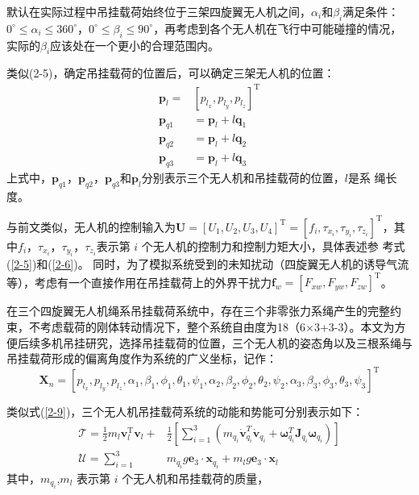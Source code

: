 \documentclass[lang=chs, degree=master, blindreview=false, winfonts=true]{yanputhesis}
\begin{document}
默认在实际过程中吊挂载荷始终位于三架四旋翼无人机之间，$\alpha_{i}$和$\beta_i$满足条件：
$0^\circ\leq\alpha_i\leq360^\circ$，$0^\circ\leq\beta_i\leq90^\circ$，再考虑到各个无人机在飞行中可能碰撞的情况，实际的$\beta_i$应该处在一个更小的合理范围内。

类似(2-5)，确定吊挂载荷的位置后，可以确定三架无人机的位置：
\begin{equation}
\begin{aligned}
	\boldsymbol{p}_{l}=&\left[p_{l_{x}},p_{l_{y}},p_{l_{z}}\right]^{\mathrm{T}} \\
	\boldsymbol{p}_{q1}&=\boldsymbol{p}_l+l\boldsymbol{q}_1 \\
	\boldsymbol{p}_{q2}&=\boldsymbol{p}_{l}+l\boldsymbol{q}_{2} \\
	\boldsymbol{p}_{q3}&=\boldsymbol{p}_l+l\boldsymbol{q}_3
\end{aligned}
\end{equation}
上式中，$\bm{p}_{q1}$，$\bm{p}_{q2}$，$\bm{p}_{q3}$和$\bm{p}_l$分别表示三个无人机和吊挂载荷的位置，$l$是系
绳长度。

与前文类似，无人机的控制输入为$\bm{U}=\left[U_1,U_2,U_3,U_4\right]^\mathrm{T}=\left[f_i,\tau_{x_i},\tau_{y_i},\tau_{z_i}\right]^\mathrm{T}$，其中$f_{i}$，$\tau_{x_i}$，$\tau_{y_i}$，$\tau_{z_i}$表示第 $i$ 个无人机的控制力和控制力矩大小，具体表述参
考式(\ref{2-5})和(\ref{2-6})。
同时，为了模拟系统受到的未知扰动（四旋翼无人机的诱导气流等），考虑有一个直接作用在吊挂载荷上的外界干扰力${\boldsymbol{f}}_{w}=\left[F_{xw},F_{yw},F_{zw}\right]^\mathrm{T}$。

在三个四旋翼无人机绳系吊挂载荷系统中，存在三个非零张力系绳产生的完整约束，不考虑载荷的刚体转动情况下，整个系统自由度为18（6×3+3-3）。本文为方便后续多机吊挂研究，选择吊挂载荷的位置，三个无人机的姿态角以及三根系绳与吊挂载荷形成的偏离角度作为系统的广义坐标，记作：
$$\boldsymbol{X}_n=
\left[
	p_{l_x} , p_{l_y} , p_{l_z},\alpha_1,\beta_1,\phi_1,\theta_1,\psi_1,\alpha_2,\beta_2,\phi_2,\theta_2,\psi_2,\alpha_3,\beta_3,\phi_3,\theta_3,\psi_3
\right]^\mathrm T$$

类似式(\ref{2-9})，三个无人机吊挂载荷系统的动能和势能可分别表示如下：
\begin{equation}
	\begin{aligned}
	\mathcal{T}=\frac{1}{2}m_{l}{\boldsymbol{v}}_{l}^\mathrm{T}{\boldsymbol{v}}_{l}+&\frac{1}{2}\left[\sum_{i=1}^{3}\left(m_{q_{i}}\dot{\boldsymbol{v}}_{q_{i}}^{T}\dot{\boldsymbol{v}}_{q_{i}}+\boldsymbol{\omega}_{q_{i}}^{T}\boldsymbol{J}_{q_{i}}\boldsymbol{\omega}_{q_{i}}\right)\right] \\
	\mathcal{U}=\sum_{i=1}^{3}&m_{q_{i}}g\boldsymbol{e}_3\cdot\boldsymbol{x}_{q_{i}}+m_{l}g\boldsymbol{e}_3\cdot\boldsymbol{x}_{l}
\end{aligned}
\label{2-18}
\end{equation}
其中，$m_{q_{i}}$,$m_l$ 表示第 $i$ 个无人机和吊挂载荷的质量，
\end{document}
